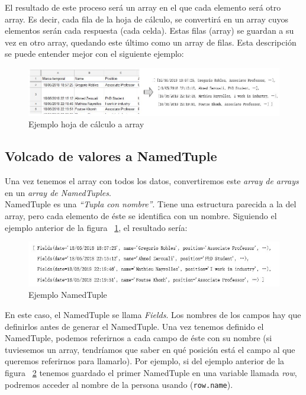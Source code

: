 \documentclass[a4paper, 12pt]{book}
\begin{document}
El resultado de este proceso será un array en el que cada elemento será otro array. Es decir, cada fila de la hoja de cálculo, se convertirá en un array cuyos elementos serán cada respuesta (cada celda). Estas filas (array) se guardan a su vez en otro array, quedando este último como un array de filas. Esta descripción se puede entender mejor con el siguiente ejemplo:

\begin{figure}[h!]
	\centering
	\includegraphics[width=17cm, keepaspectratio]{img/ejemplo45real}
	\caption{Ejemplo hoja de cálculo a array}
	\label{fig:ejemplo4_5}
\end{figure}

\subsection{Volcado de valores a NamedTuple}
\label{subsec:namedtuple}
Una vez tenemos el array con todos los datos, convertiremos este \textit{array de arrays} en un \textit{array de NamedTuples}.\\

NamedTuple es una \textit{``Tupla con nombre''}. Tiene una estructura parecida a la del array, pero cada elemento de éste se identifica con un nombre. Siguiendo el ejemplo anterior de la figura ~\ref{fig:ejemplo4_5}, el resultado sería:\\

\begin{figure}[h!]
	\centering
	\includegraphics[width=17cm, keepaspectratio]{img/ejemplo45real2}
	\caption{Ejemplo NamedTuple}
	\label{fig:ejemplo4_5Namedtuple}
\end{figure}


En este caso, el NamedTuple se llama \textit{Fields}. Los nombres de los campos hay que definirlos antes de generar el NamedTuple. Una vez tenemos definido el NamedTuple, podemos referirnos a cada campo de éste con su nombre (si tuviesemos un array, tendríamos que saber en qué posición está el campo al que queremos referirnos para llamarlo). Por ejemplo, si del ejemplo anterior de la figura ~\ref{fig:ejemplo4_5Namedtuple} tenemos guardado el primer NamedTuple en una variable llamada \textit{row}, podremos acceder al nombre de la persona usando (\verb"row.name").
\end{document}
